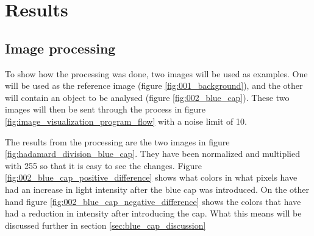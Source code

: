 \section{Results}

\subsection{Image processing}
\label{sec:image_processing}

To show how the processing was done, two images will be used as examples. One will be used as the reference image (figure \ref{fig:001_background}), and the other will contain an object to be analysed (figure \ref{fig:002_blue_cap}). These two images will then be sent through the process in figure \ref{fig:image_visualization_program_flow} with a noise limit of 10. 

The results from the processing are the two images in figure \ref{fig:hadamard_division_blue_cap}. They have been normalized and multiplied with 255 so that it is easy to see the changes. %
Figure \ref{fig:002_blue_cap_positive_difference} shows what colors in what pixels have had an increase in light intensity after the blue cap was introduced. On the other hand figure \ref{fig:002_blue_cap_negative_difference} shows the colors that have had a reduction in intensity after introducing the cap. What this means will be discussed further in section \ref{sec:blue_cap_discussion}

